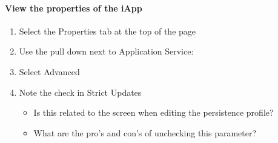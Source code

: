 \documentclass[letterpaper,10pt,english]{sphinxmanual}
\begin{document}
\paragraph{View the properties of the iApp}
\label{\detokenize{class2/module1/lab1:view-the-properties-of-the-iapp}}\begin{enumerate}
\item {} 
Select the Properties tab at the top of the page


\item {} 
Use the pull down next to Application Service:

\item {} 
Select Advanced

\item {} 
Note the check in Strict Updates
\begin{itemize}
\item {} 
Is this related to the screen when editing the persistence profile?

\item {} 
What are the pro’s and con’s of unchecking this parameter?

\end{itemize}

\end{enumerate}
\end{document}
